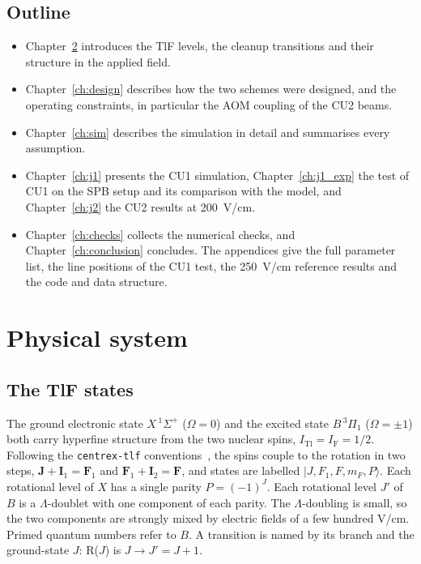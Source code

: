 \documentclass[11pt,a4paper,oneside]{report}
\newcommand{\code}[1]{\texttt{#1}}
\begin{document}
\section{Outline}

\begin{itemize}[itemsep=1pt]
  \item Chapter~\ref{ch:system} introduces the TlF levels, the cleanup transitions and their
        structure in the applied field.
  \item Chapter~\ref{ch:design} describes how the two schemes were designed, and the
        operating constraints, in particular the AOM coupling of the CU2 beams.
  \item Chapter~\ref{ch:sim} describes the simulation in detail and summarises every
        assumption.
  \item Chapter~\ref{ch:j1} presents the CU1 simulation, Chapter~\ref{ch:j1_exp} the test of CU1
        on the SPB setup and its comparison with the model, and Chapter~\ref{ch:j2} the CU2 results
        at \SI{200}{V/cm}.
  \item Chapter~\ref{ch:checks} collects the numerical checks, and
        Chapter~\ref{ch:conclusion} concludes. The appendices give the full parameter list,
        the line positions of the CU1 test, the \SI{250}{V/cm} reference results and the code and
        data structure.
\end{itemize}

\chapter{Physical system}
\label{ch:system}

\section{The TlF states}

The ground electronic state $X\,{}^1\Sigma^+$ ($\Omega=0$) and the excited state
$B\,{}^3\Pi_1$ ($\Omega=\pm1$) both carry hyperfine structure from the two nuclear spins,
$I_{\mathrm{Tl}}=I_{\mathrm F}=1/2$. Following the \code{centrex-tlf}
conventions~\cite{centrextlf}, the spins couple to the rotation in two steps,
$\mathbf J+\mathbf I_1=\mathbf F_1$ and $\mathbf F_1+\mathbf I_2=\mathbf F$, and states are
labelled $|J,F_1,F,m_F,P\rangle$. Each rotational level of $X$ has a single parity
$P=(-1)^J$. Each rotational level $J'$ of $B$ is a $\Lambda$-doublet with one component of
each parity. The $\Lambda$-doubling is small, so the two components are strongly mixed by
electric fields of a few hundred V/cm. Primed quantum numbers refer to $B$. A transition is
named by its branch and the ground-state $J$: R($J$) is $J\to J'=J+1$.
\end{document}
